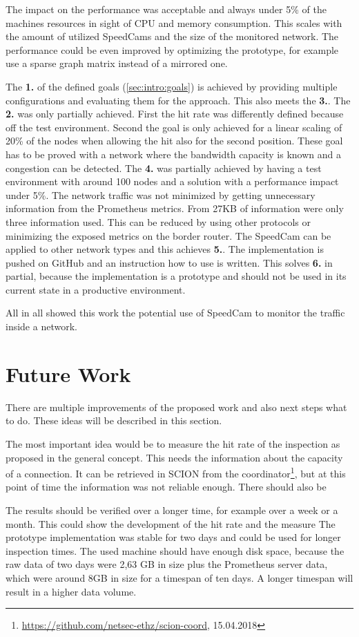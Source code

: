 \documentclass[thesis.tex]{subfiles}
\begin{document}
The impact on the performance was acceptable and always under 5\% of the machines resources in sight of CPU and memory consumption. This scales with the amount of utilized SpeedCams and the size of the monitored network. The performance could be even improved by optimizing the prototype, for example use a sparse graph matrix instead of a mirrored one. 

The \textbf{1.} of the defined goals (\autoref{sec:intro:goals}) is achieved by providing multiple configurations and evaluating them for the approach. This also meets the \textbf{3.}. The \textbf{2.} was only partially achieved. First the hit rate was differently defined because off the test environment. Second the goal is only achieved for a linear scaling of 20\% of the nodes when allowing the hit also for the second position. These goal has to be proved with a network where the bandwidth capacity is known and a congestion can be detected. The \textbf{4.} was partially achieved by having a test environment with around 100 nodes and a solution with a performance impact under 5\%. The network traffic was not minimized by getting unnecessary information from the Prometheus metrics. From 27KB of information were only three information used. This can be reduced by using other protocols or minimizing the exposed metrics on the border router. The SpeedCam can be applied to other network types and this achieves \textbf{5.}. The implementation is pushed on GitHub and an instruction how to use is written. This solves \textbf{6.} in partial, because the implementation is a prototype and should not be used in its current state in a productive environment. 

All in all showed this work the potential use of SpeedCam to monitor the traffic inside a network.

\section{Future Work}
There are multiple improvements of the proposed work and also next steps what to do. These ideas will be described in this section.

The most important idea would be to measure the hit rate of the inspection as proposed in the general concept. This needs the information about the capacity of a connection. It can be retrieved in SCION from the coordinator\footnote{\url{https://github.com/netsec-ethz/scion-coord}, 15.04.2018}, but at this point of time the information was not reliable enough. There should also be 

The results should be verified over a longer time, for example over a week or a month. This could show the development of the hit rate and the measure The prototype implementation was stable for two days and could be used for longer inspection times. The used machine should have enough disk space, because the raw data of two days were 2,63 GB in size plus the Prometheus server data, which were around 8GB in size for a timespan of ten days. A longer timespan will result in a higher data volume. 

\subfilebib %
\end{document}
